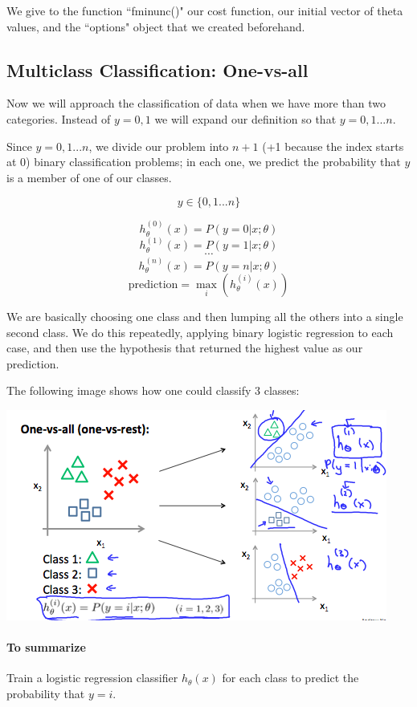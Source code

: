 \documentclass[UTF8]{article}
\begin{document}
We give to the function ``fminunc()" our cost function, our initial vector of theta values, and the ``options" object that we created beforehand.

\subsection{Multiclass Classification: One-vs-all}

Now we will approach the classification of data when we have more than two categories. Instead of $y = {0,1}$ we will expand our definition so that $y = {0,1...n}$.

Since $y = {0,1...n}$, we divide our problem into $n+1$ (+1 because the index starts at 0) binary classification problems; in each one, we predict the probability that $y$ is a member of one of our classes.

\[ y \in \lbrace0, 1 ... n\rbrace \]

\[ h_\theta^{(0)}(x) = P(y = 0 | x ; \theta) \]
\[ h_\theta^{(1)}(x) = P(y = 1 | x ; \theta) \]
\[ \cdots \]
\[ h_\theta^{(n)}(x) = P(y = n | x ; \theta) \]
\[ \mathrm{prediction} = \max_i( h_\theta ^{(i)}(x) )\]

We are basically choosing one class and then lumping all the others into a single second class. We do this repeatedly, applying binary logistic regression to each case, and then use the hypothesis that returned the highest value as our prediction.

The following image shows how one could classify 3 classes:

\includegraphics[width = .8\textwidth]{NotePics/6_7_1.png}

\paragraph{To summarize}

Train a logistic regression classifier $h_\theta(x)$ for each class to predict the probability that $y=i$.
\end{document}
